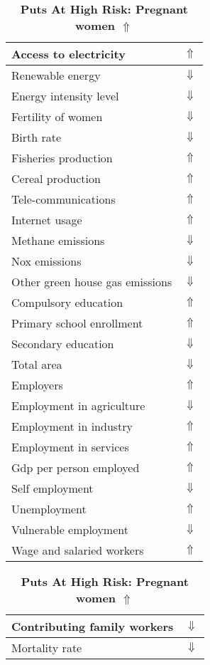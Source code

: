 \documentclass[12pt,notitlepage,oneside]{report}
\begin{document}
\begin{table}[!htb]
\caption{\textbf{Puts At High Risk: Pregnant women $\Uparrow$}}
\centering
\label{Correlated Socio-economic Factors0}
\begin{tabular}{|l|l|}
\hline
Access to electricity & $\Uparrow$\\ \hline
Renewable energy & $\Downarrow$\\ \hline
Energy intensity level & $\Downarrow$\\ \hline
Fertility of women & $\Downarrow$\\ \hline
Birth rate & $\Downarrow$\\ \hline
Fisheries production & $\Uparrow$\\ \hline
Cereal production & $\Uparrow$\\ \hline
Tele-communications & $\Uparrow$\\ \hline
Internet usage & $\Uparrow$\\ \hline
Methane emissions & $\Downarrow$\\ \hline
Nox emissions & $\Downarrow$\\ \hline
Other green house gas emissions & $\Downarrow$\\ \hline
Compulsory education & $\Uparrow$\\ \hline
Primary school enrollment & $\Uparrow$\\ \hline
Secondary education & $\Downarrow$\\ \hline
Total area & $\Downarrow$\\ \hline
Employers & $\Uparrow$\\ \hline
Employment in agriculture & $\Downarrow$\\ \hline
Employment in industry & $\Uparrow$\\ \hline
Employment in services & $\Uparrow$\\ \hline
Gdp per person employed & $\Uparrow$\\ \hline
Self employment & $\Downarrow$\\ \hline
Unemployment & $\Uparrow$\\ \hline
Vulnerable employment & $\Downarrow$\\ \hline
Wage and salaried workers & $\Uparrow$\\ \hline
\end{tabular}
\begin{tabular}{|l|l|}
\hline
Contributing family workers & $\Downarrow$\\ \hline
Mortality rate & $\Downarrow$\\ \hline

\end{tabular}
\end{table}
\end{document}
